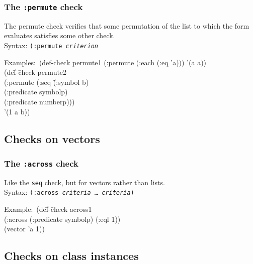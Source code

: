\documentclass{article}
\begin{document}
\subsubsection{The \texttt{:permute} check}
The permute check verifies that some permutation of the list to which
the form evaluates satisfies some other check.
\\ Syntax: \texttt{(:permute \textit{criterion}}
{\ttfamily\begin{tabbing}
\textrm{Examples:}\ \=(def-check permute1 (:permute (:each (:eq 'a))) '(a a))
\\ \> (de\=f-\=check permute2
\\ \> \> \> (:permute (:seq \=(:symbol b)
\\ \> \> \>             \>(:predicate symbolp)
\\ \> \> \>             \>(:predicate numberp)))
\\ \> \>'(1 a b))
\end{tabbing}}

\subsection{Checks on vectors}

\subsubsection{The \texttt{:across} check}
Like the \texttt{seq} check, but for vectors rather than
lists.
\\ Syntax: \texttt{(:across \emph{criteria} \ldots\ \emph{criteria})}
{\ttfamily\begin{tabbing}
\textrm{Example:}\ (de\=f-\=check across1
\\ \>\>  (:across (:predicate symbolp) (:eql 1))
\\ \>  (vector 'a 1))
\end{tabbing}}

\subsection{Checks on class instances}
\end{document}
